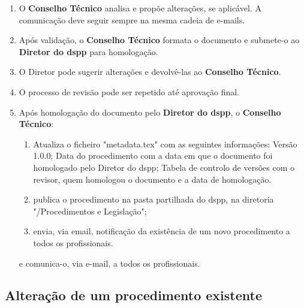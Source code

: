\begin{enumerate}
  \item O \textbf{Conselho Técnico} analisa e propõe alterações, se aplicável. A comunicação deve seguir sempre na mesma cadeia de e-mails.
  \item Após validação, o \textbf{Conselho Técnico} formata o documento e submete-o ao \textbf{Diretor do \gls{dspp}} para homologação.
  \item O Diretor pode sugerir alterações e devolvê-las ao \textbf{Conselho Técnico}.
  \item O processo de revisão pode ser repetido até aprovação final.
  \item Após homologação do documento pelo \textbf{Diretor do \gls{dspp}}, o \textbf{Conselho Técnico}:
  \begin{enumerate}
    \item Atualiza o ficheiro "metadata.tex" com as seguintes informações: Versão 1.0.0; Data do procedimento com a data em que o documento foi homologado pelo Diretor do \gls{dspp}; Tabela de controlo de versões com o revisor, quem homologou o documento e a data de homologação.
    \item publica o procedimento na pasta partilhada do \gls{dspp}, na diretoria "/Procedimentos e Legislação";
    \item envia, via email, notificação da existência de um novo procedimento a todos os profissionais.
  \end{enumerate}
  
   e comunica-o, via e-mail, a todos os profissionais.
\end{enumerate}

\subsection{Alteração de um procedimento existente}

